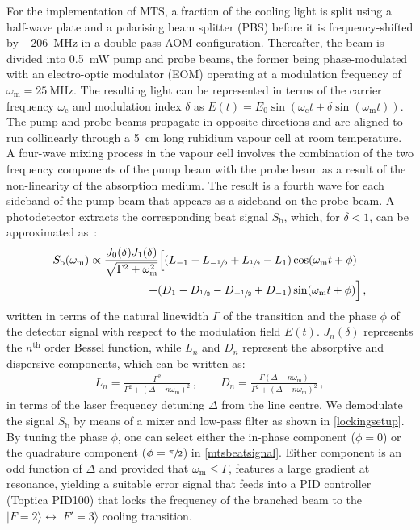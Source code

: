 \documentclass[../Thesis-IJspeert.tex]{subfiles}
\begin{document}
For the implementation of MTS, a fraction of the cooling light is split using a half-wave plate and a polarising beam splitter (PBS) before it is frequency-shifted by \SI{-206}{\mega\hertz} in a double-pass AOM configuration. Thereafter, the beam is divided into \SI{0.5}{\milli\watt} pump and probe beams, the former being phase-modulated with an electro-optic modulator (EOM) operating at a modulation frequency of $\omega_\mathrm{m}=\SI{25}{\mega\hertz}$. The resulting light can be represented in terms of the carrier frequency $\omega_\mathrm{c}$ and modulation index $\delta$ as $E(t)=E_0\sin(\omega_\mathrm{c} t+\delta\sin(\omega_\mathrm{m} t))$. The pump and probe beams propagate in opposite directions and are aligned to run collinearly through a \SI{5}{\centi\meter} long rubidium vapour cell at room temperature. A four-wave mixing process in the vapour cell involves the combination of the two frequency components of the pump beam with the probe beam as a result of the non-linearity of the absorption medium. The result is a fourth wave for each sideband of the pump beam that appears as a sideband on the probe beam. A photodetector extracts the corresponding beat signal $S_\mathrm{b}$, which, for $\delta < 1$, can be approximated as~\cite{Shirley1982}:
\begin{align}
\label{mtsbeatsignal}
\begin{split}
	S_\mathrm{b}(\omega_\mathrm{m}) \propto \frac{J_0(\delta)J_1(\delta)}{\sqrt{\Gamma^2+\omega_\mathrm{m}^2}}  \Big[ (L_{-1} - L_{-\sfrac{1}{2}} + L_{\sfrac{1}{2}} - L_1) &\cos(\omega_\mathrm{m} t + \phi) \\
	+ (D_{1} - D_{\sfrac{1}{2}} - D_{-\sfrac{1}{2}} + D_{-1}) &\sin(\omega_\mathrm{m} t + \phi) \Big]\,,
\end{split}
\end{align}
written in terms of the natural linewidth $\Gamma$ of the transition and the phase $\phi$ of the detector signal with respect to the modulation field $E(t)$. $J_n(\delta)$ represents the $n^{\mathrm{th}}$ order Bessel function, while $L_n$ and $D_n$ represent the absorptive and dispersive components, which can be written as:
\begin{align}
L_n = \frac{\Gamma^2}{\Gamma^2 + (\Delta - n \omega_\mathrm{m})^2}\,,\quad\quad D_n = \frac{\Gamma (\Delta - n \omega_\mathrm{m})}{\Gamma^2 + (\Delta - n \omega_\mathrm{m})^2}\,,
\end{align}
in terms of the laser frequency detuning $\Delta$ from the line centre. We demodulate the signal $S_\mathrm{b}$ by means of a mixer and low-pass filter as shown in \autoref{lockingsetup}. By tuning the phase $\phi$, one can select either the in-phase component ($\phi=0$) or the quadrature component ($\phi=\sfrac{\pi}{2}$) in \autoref{mtsbeatsignal}. Either component is an odd function of $\Delta$ and provided that $\omega_\mathrm{m}\le \Gamma$, features a large gradient at resonance, yielding a suitable error signal that feeds into a PID controller (Toptica PID100) that locks the frequency of the branched beam to the $ \vert F = 2\rangle \leftrightarrow \vert F' = 3 \rangle$ cooling transition.
\end{document}
